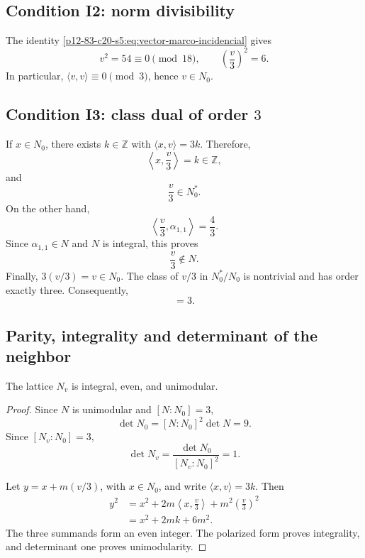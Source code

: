 \subsection{Condition I2: norm divisibility}

The identity \eqref{p12-83-c20-s5:eq:vector-marco-incidencial} gives
\begin{equation}
 v^2=54\equiv0\pmod{18},
 \qquad
 \left(\frac v3\right)^2=6.
 \label{p12-83-c20-s5:eq:condicion-i2-vecino}
\end{equation}
In particular, \(\langle v,v\rangle\equiv0\pmod3\), hence
\(v\in N_0\).

\subsection{Condition I3: class dual of order \(3\)}

If \(x\in N_0\), there exists \(k\in\mathbb Z\) with
\(\langle x,v\rangle=3k\). Therefore,
\[
 \left\langle x,\frac v3\right\rangle=k\in\mathbb Z,
\]
and
\begin{equation}
 \frac v3\in N_0^*.
 \label{p12-83-c20-s5:eq:v-tercio-en-dual-nucleo}
\end{equation}
On the other hand,
\[
 \left\langle\frac v3,\alpha_{1,1}\right\rangle=\frac43.
\]
Since \(\alpha_{1,1}\in N\) and \(N\) is integral, this proves
\begin{equation}
 \frac v3\notin N.
 \label{p12-83-c20-s5:eq:v-tercio-no-en-niemeier}
\end{equation}
Finally, \(3(v/3)=v\in N_0\). The class of \(v/3\) in
\(N_0^*/N_0\) is nontrivial and has order exactly three. Consequently,
\begin{equation}
 [N_v:N_0]=3.
 \label{p12-83-c20-s5:eq:indice-extension-vecino}
\end{equation}

\subsection{Parity, integrality and determinant of the neighbor}

\begin{proposition}
\label{p12-83-c20-s5:prop:estructura-unimodular-vecino}
The lattice \(N_v\) is integral, even, and unimodular.
\end{proposition}

\begin{proof}
Since \(N\) is unimodular and \([N:N_0]=3\),
\[
 \det N_0=[N:N_0]^2\det N=9.
\]
Since \([N_v:N_0]=3\),
\[
 \det N_v=\frac{\det N_0}{[N_v:N_0]^2}=1.
\]

Let \(y=x+m(v/3)\), with \(x\in N_0\), and write
\(\langle x,v\rangle=3k\). Then
\begin{align*}
 y^2
 &=x^2+2m\left\langle x,\frac v3\right\rangle
       +m^2\left(\frac v3\right)^2\\
 &=x^2+2mk+6m^2.
\end{align*}
The three summands form an even integer. The polarized form proves
integrality, and determinant one proves unimodularity.
\end{proof}

